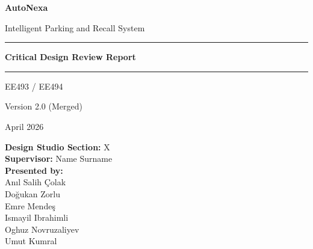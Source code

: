 \documentclass[12pt,a4paper]{report}
\newcommand{\pname}{AutoNexa}
\newcommand{\reportdate}{April 2026}
\newcommand{\courseinfo}{EE493 / EE494}
\newcommand{\ver}{Version 2.0 (Merged)}
\begin{document}
\begin{titlepage}
    \centering
    \vspace*{1.5cm}

    {\Huge \textbf{\textcolor{navyblue}{\pname}} \par}
    \vspace{0.4cm}
    {\LARGE Intelligent Parking and Recall System \par}
    \vspace{1.5cm}

    \noindent\rule{\textwidth}{1.5pt}
    \vspace{0.4cm}

    {\Huge \textbf{Critical Design Review Report} \par}
    \vspace{0.4cm}
    \noindent\rule{\textwidth}{1.5pt}

    \vspace{1cm}
    {\Large \courseinfo \par}
    \vspace{0.3cm}
    {\large \ver \par}
    \vspace{0.3cm}
    {\large \reportdate \par}

    \vfill

    \begin{flushleft}
    \textbf{Design Studio Section:} X \\[0.4cm]
    \textbf{Supervisor:} Name Surname \\[0.4cm]
    \textbf{Presented by:} \\[0.3cm]
    \quad An\i{}l Salih \c{C}olak \\
    \quad Do\u{g}ukan Zorlu \\
    \quad Emre Mende\c{s} \\
    \quad Ismayil Ibrahimli \\
    \quad Oghuz Novruzaliyev \\
    \quad Umut Kumral \\
    \end{flushleft}

    \vfill
\end{titlepage}

\tableofcontents
\clearpage
\listoffigures
\clearpage
\listoftables
\clearpage
{}

\end{document}
